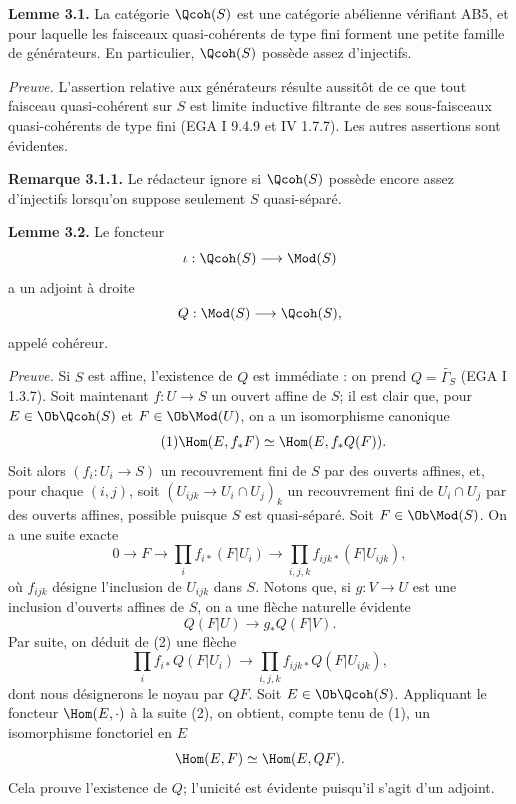 \documentclass[11pt]{article}
\begin{document}
\textbf{Lemme 3.1.} La catégorie $\Qcoh(S)$ est une catégorie abélienne vérifiant AB5, et pour laquelle les faisceaux quasi-cohérents de type fini forment une petite famille de générateurs. En particulier, $\Qcoh(S)$ possède assez d'injectifs.

\emph{Preuve.} L'assertion relative aux générateurs résulte aussitôt de ce que tout faisceau quasi-cohérent sur $S$ est limite inductive filtrante de ses sous-faisceaux quasi-cohérents de type fini (EGA I 9.4.9 et IV 1.7.7). Les autres assertions sont évidentes.

\textbf{Remarque 3.1.1.} Le rédacteur ignore si $\Qcoh(S)$ possède encore assez d'injectifs lorsqu'on suppose seulement $S$ quasi-séparé.

\textbf{Lemme 3.2.} Le foncteur
\[
 \iota:\Qcoh(S)\longrightarrow\Mod(S)
\]
a un adjoint à droite
\[
 Q:\Mod(S)\longrightarrow\Qcoh(S),
\]
appelé cohéreur.

\emph{Preuve.} Si $S$ est affine, l'existence de $Q$ est immédiate : on prend $Q=\widetilde{\Gamma_S}$ (EGA I 1.3.7). Soit maintenant $f:U\to S$ un ouvert affine de $S$; il est clair que, pour $E\in\Ob\Qcoh(S)$ et $F\in\Ob\Mod(U)$, on a un isomorphisme canonique
\begin{equation}\tag{1}
 \Hom(E,f_*F)\simeq \Hom(E,f_*Q(F)).
\end{equation}
Soit alors $(f_i:U_i\to S)$ un recouvrement fini de $S$ par des ouverts affines, et, pour chaque $(i,j)$, soit $(U_{ijk}\to U_i\cap U_j)_k$ un recouvrement fini de $U_i\cap U_j$ par des ouverts affines, possible puisque $S$ est quasi-séparé. Soit $F\in\Ob\Mod(S)$. On a une suite exacte
\begin{equation}\tag{2}
 0\longrightarrow F\longrightarrow \prod_i f_{i*}(F|U_i)
 \longrightarrow \prod_{i,j,k}f_{ijk*}(F|U_{ijk}),
\end{equation}
où $f_{ijk}$ désigne l'inclusion de $U_{ijk}$ dans $S$. Notons que, si $g:V\to U$ est une inclusion d'ouverts affines de $S$, on a une flèche naturelle évidente
\[
 Q(F|U)\longrightarrow g_*Q(F|V).
\]
Par suite, on déduit de (2) une flèche
\begin{equation}\tag{3}
 \prod_i f_{i*}Q(F|U_i)\longrightarrow
 \prod_{i,j,k}f_{ijk*}Q(F|U_{ijk}),
\end{equation}
dont nous désignerons le noyau par $QF$. Soit $E\in\Ob\Qcoh(S)$. Appliquant le foncteur $\Hom(E,\cdot)$ à la suite (2), on obtient, compte tenu de (1), un isomorphisme fonctoriel en $E$
\[
 \Hom(E,F)\simeq\Hom(E,QF).
\]
Cela prouve l'existence de $Q$; l'unicité est évidente puisqu'il s'agit d'un adjoint.
\end{document}
